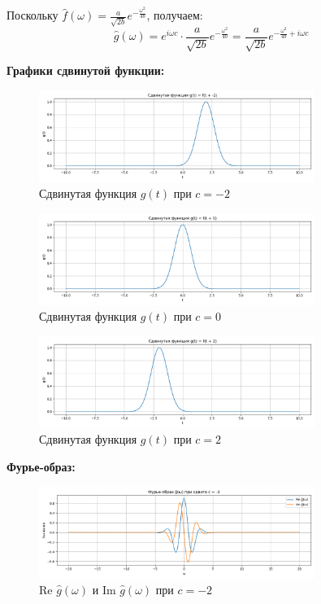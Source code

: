 Поскольку $\hat{f}(\omega) = \frac{a}{\sqrt{2b}} e^{-\frac{\omega^2}{4b}}$, получаем:
\[
\hat{g}(\omega) = e^{i \omega c} \cdot \frac{a}{\sqrt{2b}} e^{-\frac{\omega^2}{4b}} = \frac{a}{\sqrt{2b}} e^{-\frac{\omega^2}{4b} + i \omega c}
\]

\textbf{Графики сдвинутой функции:}

\begin{figure}[H]
    \centering
    \includegraphics[width=0.8\textwidth]{g_function_c-2.png}
    \caption{Сдвинутая функция $g(t)$ при $c = -2$}
\end{figure}

\begin{figure}[H]
    \centering
    \includegraphics[width=0.8\textwidth]{g_function_c0.png}
    \caption{Сдвинутая функция $g(t)$ при $c = 0$}
\end{figure}

\begin{figure}[H]
    \centering
    \includegraphics[width=0.8\textwidth]{g_function_c2.png}
    \caption{Сдвинутая функция $g(t)$ при $c = 2$}
\end{figure}

\textbf{Фурье-образ:}

\begin{figure}[H]
    \centering
    \includegraphics[width=0.8\textwidth]{g_hat_complex_c-2.png}
    \caption{Re $\hat{g}(\omega)$ и Im $\hat{g}(\omega)$ при $c = -2$}
\end{figure}

